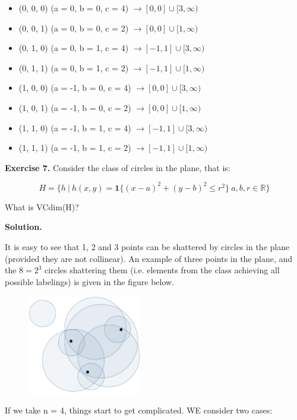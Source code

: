 \documentclass{article}
\newcommand{\<}{\langle}
\renewcommand{\>}{\rangle}
\theoremstyle{definition}
\begin{document}
\begin{itemize}
    \item[] (0, 0, 0) (a = 0, b = 0, c = 4) $\rightarrow [0, 0] \cup [3, \infty)$
    \item[] (0, 0, 1) (a = 0, b = 0, c = 2) $\rightarrow [0, 0] \cup [1, \infty)$
    \item[] (0, 1, 0) (a = 0, b = 1, c = 4) $\rightarrow [-1, 1] \cup [3, \infty)$
    \item[] (0, 1, 1) (a = 0, b = 1, c = 2) $\rightarrow [-1, 1] \cup [1, \infty)$
    \item[] (1, 0, 0) (a = -1, b = 0, c = 4) $\rightarrow [0, 0] \cup [3, \infty)$
    \item[] (1, 0, 1) (a = -1, b = 0, c = 2) $\rightarrow [0, 0] \cup [1, \infty)$
    \item[] (1, 1, 0) (a = -1, b = 1, c = 4) $\rightarrow [-1, 1] \cup [3, \infty)$
    \item[] (1, 1, 1) (a = -1, b = 1, c = 2) $\rightarrow [-1, 1] \cup [1, \infty)$
\end{itemize}

\textbf{Exercise 7.} Consider the class of circles in the plane, that is:

$$H = \{h \ | \ h(x, y) = \textbf{1}\{(x-a)^2 + (y-b)^2 \leq r^2\} \ a,b,r \in \mathbb{R}\}$$

What is VCdim(H)?

\textbf{Solution.}

It is easy to see that 1, 2 and 3 points can be shattered by circles in the plane (provided they are not collinear). An example of three points in the plane, and the $8 = 2^3$ circles shattering them (i.e. elements from the class achieving all possible labelings) is given in the figure below.

\begin{figure}[h]
    \centering
    \includegraphics[width=5cm]{circles.png}
\end{figure}


If we take n = 4, things start to get complicated. WE consider two cases:
\end{document}
